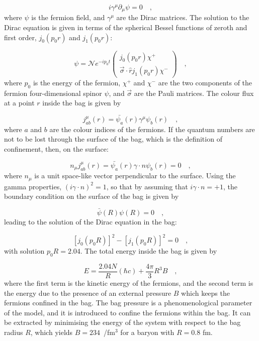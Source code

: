 \begin{equation*}
    i\gamma^\mu\partial_\mu\psi = 0\quad ,
\end{equation*}
where $\psi$ is the fermion field, and $\gamma^\mu$ are the Dirac matrices. The solution to the Dirac equation is given in terms of the spherical Bessel functions of zeroth and first order, $j_0(p_0r)$ and $j_1(p_0r)$:

\begin{equation*}
    \psi = \mathcal{N} e^{-ip_0t} \begin{pmatrix} j_0(p_0r)\chi^+ \\ \vec{\sigma}\cdot\hat{r}j_1(p_0r)\chi^-\end{pmatrix}\quad ,
\end{equation*}
where $p_0$ is the energy of the fermion, $\chi^+$ and $\chi^-$ are the two components of the fermion four-dimensional spinor $\psi$, and $\vec{\sigma}$ are the Pauli matrices. The colour flux at a point $r$ inside the bag is given by

\begin{equation*}
    j_{ab}^\mu(r) = \bar{\psi_a}(r)\gamma^\mu\psi_b(r)\quad ,
\end{equation*}
where $a$ and $b$ are the colour indices of the fermions. If the quantum numbers are not to be lost through the surface of the bag, which is the definition of confinement, then, on the surface:

\begin{equation*}
  n_\mu j_{ab}^\mu(r) = \bar{\psi_a}(r)\gamma\cdot n \psi_b(r) = 0\quad ,
\end{equation*}
 where $n_\mu$ is a unit space-like vector perpendicular to the surface. Using the gamma properties, $(i\gamma\cdot n)^2 = 1$, so that by assuming that $i\gamma\cdot n = + 1$, the boundary condition on the surface of the bag is given by

\begin{equation*}
    \bar{\psi}(R)\psi(R) = 0\quad ,
\end{equation*}
leading to the solution of the Dirac equation in the bag:

\begin{equation*}
    \left[j_0\left(p_0R\right)\right]^2 - \left[j_1\left(p_0R\right)\right]^2 = 0\quad ,
\end{equation*}
with solution $p_0R = 2.04$. The total energy inside the bag is given by

\begin{equation*}
    E = \frac{2.04 N}{R}(\hbar c) + \frac{4\pi}{3}R^3B\quad ,
\end{equation*}
where the first term is the kinetic energy of the fermions, and the second term is the energy due to the presence of an external pressure $B$ which keeps the fermions confined in the bag. The bag pressure is a phenomenological parameter of the model, and it is introduced to confine the fermions within the bag. It can be extracted by minimising the energy of the system with respect to the bag radius $R$, which yields $B=234$~\mev/fm$^3$ for a baryon with $R=0.8$ fm.

